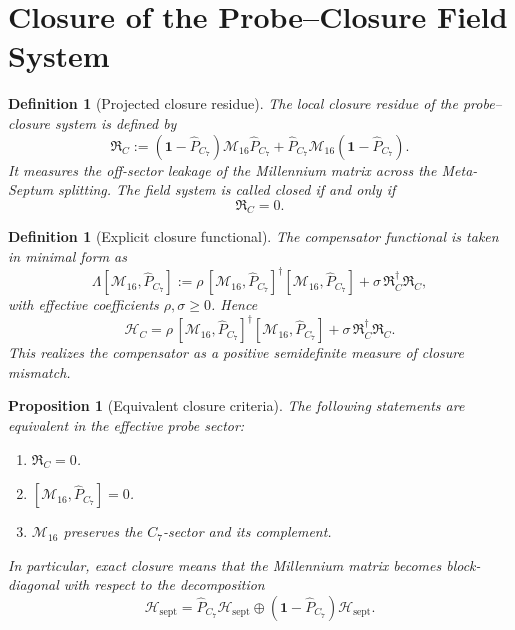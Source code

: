\documentclass[12pt,a4paper]{article}
\newtheorem{proposition}[theorem]{Proposition}
\newtheorem{definition}[theorem]{Definition}
\begin{document}

\section{Closure of the Probe--Closure Field System}
\label{sec:closure-field-system}

\begin{definition}[Projected closure residue]
The local closure residue of the probe--closure system is defined by
\[
  \mathfrak R_C
  :=
  (\mathbf 1-\hat P_{C_7})\mathcal M_{16}\hat P_{C_7}
  + \hat P_{C_7}\mathcal M_{16}(\mathbf 1-\hat P_{C_7}).
\]
It measures the off-sector leakage of the Millennium matrix across the
Meta-Septum splitting.
The field system is called \emph{closed} if and only if
\[
  \mathfrak R_C = 0.
\]
\end{definition}

\begin{definition}[Explicit closure functional]
The compensator functional is taken in minimal form as
\[
  \Lambda[\mathcal M_{16},\hat P_{C_7}]
  :=
  \rho\,[\mathcal M_{16},\hat P_{C_7}]^
  \dagger [\mathcal M_{16},\hat P_{C_7}]
  + \sigma\,\mathfrak R_C^
  \dagger \mathfrak R_C,
\]
with effective coefficients $\rho,\sigma\ge 0$.
Hence
\[
  \mathcal H_C
  =
  \rho\,[\mathcal M_{16},\hat P_{C_7}]^
  \dagger [\mathcal M_{16},\hat P_{C_7}]
  + \sigma\,\mathfrak R_C^
  \dagger \mathfrak R_C.
\]
This realizes the compensator as a positive semidefinite measure of
closure mismatch.
\end{definition}

\begin{proposition}[Equivalent closure criteria]
The following statements are equivalent in the effective probe sector:
\begin{enumerate}
  \item $\mathfrak R_C=0$.
  \item $[\mathcal M_{16},\hat P_{C_7}]=0$.
  \item $\mathcal M_{16}$ preserves the $C_7$-sector and its complement.
\end{enumerate}
In particular, exact closure means that the Millennium matrix becomes
block-diagonal with respect to the decomposition
\[
  \mathcal H_{\mathrm{sept}}
  = \hat P_{C_7}\mathcal H_{\mathrm{sept}}
  \oplus
  (\mathbf 1-\hat P_{C_7})\mathcal H_{\mathrm{sept}}.
\]
\end{proposition}
\end{document}
